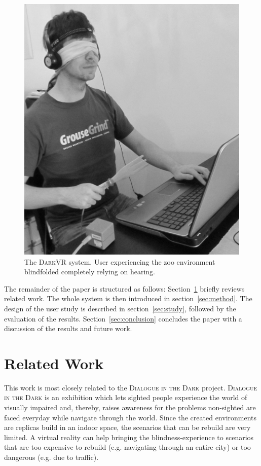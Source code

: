 \documentclass{sig-alternate}
\newcommand{\darkvr}{\textsc{DarkVR}\xspace}
\begin{document}
\begin{figure}
\centering
\includegraphics[width=0.75\columnwidth]{images/intro3}
\caption{The \darkvr system. User experiencing the zoo environment blindfolded
completely relying on hearing.}
\label{fig:intro}
\end{figure}

The remainder of the paper is structured as follows: Section~\ref{sec:related}
briefly reviews related work. The whole system is then introduced in
section~\ref{sec:method}. The design of the user study is described in
section~\ref{sec:study}, followed by the evaluation of the results.
Section~\ref{sec:conclusion} concludes the paper with a discussion of the
results and future work.

\section{Related Work}
\label{sec:related}
This work is most closely related to the \textsc{Dialogue in the Dark}
project\cite{dialog}. \textsc{Dialogue in the Dark} is an exhibition which lets
sighted people experience the world of visually impaired and, thereby, raises
awareness for the problems non-sighted are faced everyday while navigate
through the world. Since the created environments are replicas build in an
indoor space, the scenarios that can be rebuild are very limited. A
virtual reality can help bringing the blindness-experience to scenarios that are
too expensive to rebuild (e.g. navigating through an entire city) or too
dangerous (e.g. due to traffic).
\end{document}
